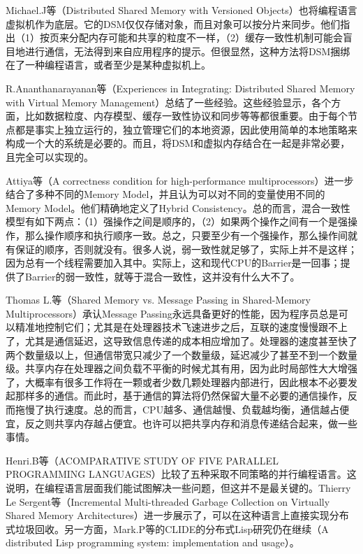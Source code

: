 \documentclass[a4paper,twoside]{scrbook}
\begin{document}
Michael.J等（Distributed Shared Memory with Versioned Objects）也将编程语言虚拟机作为底层。它的DSM仅仅存储对象，而且对象可以按分片来同步。他们指出（1）按页来分配内存可能和共享的粒度不一样，（2）缓存一致性机制可能会盲目地进行通信，无法得到来自应用程序的提示。但很显然，这种方法将DSM捆绑在了一种编程语言，或者至少是某种虚拟机上。

R.Ananthanarayanan等（Experiences in Integrating: Distributed Shared Memory with Virtual Memory Management）总结了一些经验。这些经验显示，各个方面，比如数据粒度、内存模型、缓存一致性协议和同步等等都很重要。由于每个节点都是事实上独立运行的，独立管理它们的本地资源，因此使用简单的本地策略来构成一个大的系统是必要的。而且，将DSM和虚拟内存结合在一起是非常必要，且完全可以实现的。

Attiya等（A correctness condition for high-performance multiprocessors）进一步结合了多种不同的Memory Model，并且认为可以对不同的变量使用不同的Memory Model。他们精确地定义了Hybrid Consistency。总的而言，混合一致性模型有如下两点：（1）强操作之间是顺序的，（2）如果两个操作之间有一个是强操作，那么操作顺序和执行顺序一致。总之，只要至少有一个强操作，那么操作间就有保证的顺序，否则就没有。很多人说，弱一致性就足够了，实际上并不是这样；因为总有一个线程需要加入其中。实际上，这和现代CPU的Barrier是一回事；提供了Barrier的弱一致性，就等于混合一致性，这并没有什么大不了。

Thomas L.等（Shared Memory vs. Message Passing in Shared-Memory Multiprocessors）承认Message Passing永远具备更好的性能，因为程序员总是可以精准地控制它们；尤其是在处理器技术飞速进步之后，互联的速度慢慢跟不上了，尤其是通信延迟，这导致信息传递的成本相应增加了。处理器的速度甚至快了两个数量级以上，但通信带宽只减少了一个数量级，延迟减少了甚至不到一个数量级。共享内存在处理器之间负载不平衡的时候尤其有用，因为此时局部性大大增强了，大概率有很多工作将在一颗或者少数几颗处理器内部进行，因此根本不必要发起那样多的通信。而此时，基于通信的算法将仍然保留大量不必要的通信操作，反而拖慢了执行速度。总的而言，CPU越多、通信越慢、负载越均衡，通信越占便宜，反之则共享内存越占便宜。也许可以把共享内存和消息传递结合起来，做一些事情。

Henri.B等（ACOMPARATIVE STUDY OF FIVE PARALLEL PROGRAMMING LANGUAGES）比较了五种采取不同策略的并行编程语言。这说明，在编程语言层面我们能试图解决一些问题，但这并不是最关键的。Thierry Le Sergent等（Incremental Multi-threaded Garbage Collection on Virtually Shared Memory Architectures）进一步展示了，可以在这种语言上直接实现分布式垃圾回收。另一方面，Mark.P等的CLIDE的分布式Lisp研究仍在继续（A distributed Lisp programming system: implementation and usage）。
\end{document}
